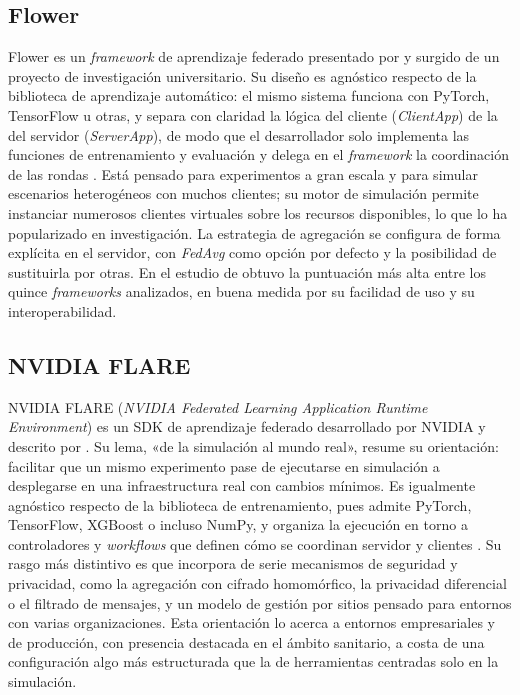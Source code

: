 \subsection{Flower}\label{sec:ea-flower}

Flower es un \textit{framework} de aprendizaje federado presentado por
\textcite{beutel2020flower} y surgido de un proyecto de investigación universitario. Su
diseño es agnóstico respecto de la biblioteca de aprendizaje automático: el mismo sistema
funciona con PyTorch, TensorFlow u otras, y separa con claridad la lógica del cliente
(\textit{ClientApp}) de la del servidor (\textit{ServerApp}), de modo que el desarrollador
solo implementa las funciones de entrenamiento y evaluación y delega en el
\textit{framework} la coordinación de las rondas \parencite{beutel2020flower}. Está
pensado para experimentos a gran escala y para simular escenarios heterogéneos con muchos
clientes; su motor de simulación permite instanciar numerosos clientes virtuales sobre los
recursos disponibles, lo que lo ha popularizado en investigación. La estrategia de
agregación se configura de forma explícita en el servidor, con \textit{FedAvg} como opción
por defecto y la posibilidad de sustituirla por otras. En el estudio de
\textcite{riedel2024comparative} obtuvo la puntuación más alta entre los quince
\textit{frameworks} analizados, en buena medida por su facilidad de uso y su
interoperabilidad.

\subsection{NVIDIA FLARE}\label{sec:ea-nvflare}

NVIDIA FLARE (\textit{NVIDIA Federated Learning Application Runtime Environment}) es un
SDK de aprendizaje federado desarrollado por NVIDIA y descrito por
\textcite{roth2022nvflare}. Su lema, «de la simulación al mundo real», resume su
orientación: facilitar que un mismo experimento pase de ejecutarse en simulación a
desplegarse en una infraestructura real con cambios mínimos. Es igualmente agnóstico
respecto de la biblioteca de entrenamiento, pues admite PyTorch, TensorFlow, XGBoost o
incluso NumPy, y organiza la ejecución en torno a controladores y \textit{workflows} que
definen cómo se coordinan servidor y clientes \parencite{roth2022nvflare}. Su rasgo más
distintivo es que incorpora de serie mecanismos de seguridad y privacidad, como la
agregación con cifrado homomórfico, la privacidad diferencial o el filtrado de mensajes, y
un modelo de gestión por sitios pensado para entornos con varias organizaciones. Esta
orientación lo acerca a entornos empresariales y de producción, con presencia destacada en
el ámbito sanitario, a costa de una configuración algo más estructurada que la de
herramientas centradas solo en la simulación.

